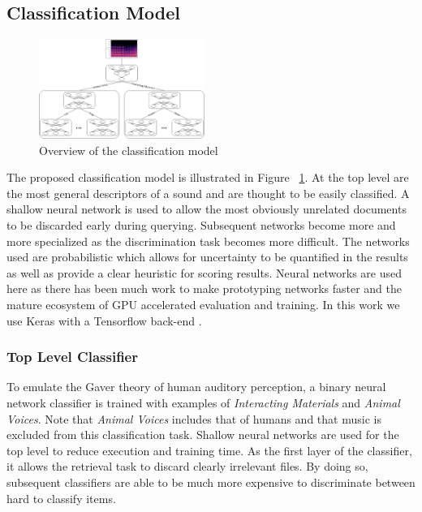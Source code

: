 \subsection{Classification Model}

\begin{figure}[h!]
    \centering
    \includegraphics[width=0.48\textwidth]{figures/NeuralNetHierarchy.png}
    \caption{Overview of the classification model}
    \label{fig:NetHier}
\end{figure}

The proposed classification model is illustrated in Figure ~\ref{fig:NetHier}. At the top level are the most general descriptors of a sound and are thought to be easily classified. A shallow neural network is used to allow the most obviously unrelated documents to be discarded early during querying. Subsequent networks become more and more specialized as the discrimination task becomes more difficult. The networks used are probabilistic which allows for uncertainty to be quantified in the results as well as provide a clear heuristic for scoring results. Neural networks are used here as there has been much work to make prototyping networks faster and the mature ecosystem of GPU accelerated evaluation and training. In this work we use Keras with a Tensorflow back-end \cite{Abadi2016, chollet2015keras}.

\subsubsection{Top Level Classifier}
To emulate the Gaver theory of human auditory perception, a binary neural network classifier is trained with examples of \textit{Interacting Materials} and \textit{Animal Voices}. Note that \textit{Animal Voices} includes that of humans and that music is excluded from this classification task. Shallow neural networks are used for the top level to reduce execution and training time. As the first layer of the classifier, it allows the retrieval task to discard clearly irrelevant files. By doing so, subsequent classifiers are able to be much more expensive to discriminate between hard to classify items.


